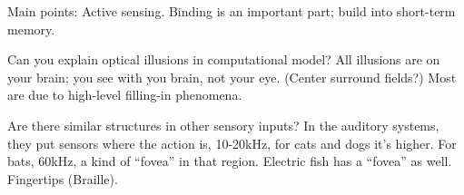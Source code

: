 Main points: Active sensing. %
Binding is an important part; build into short-term memory.

Can you explain optical illusions in computational model? All illusions are on your brain; you see with you brain, not your eye. (Center surround fields?) Most are due to high-level filling-in phenomena.

Are there similar structures in other sensory inputs? In the auditory systems, they put sensors where the action is, 10-20kHz, for cats and dogs it's higher. For bats, 60kHz, a kind of ``fovea'' in that region. 
Electric fish has a ``fovea'' as well. 
Fingertips (Braille).
